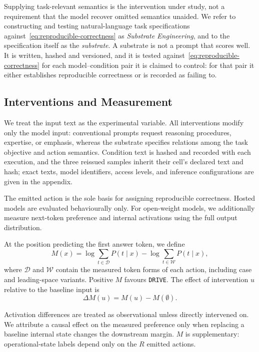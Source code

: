 Supplying task-relevant semantics is the intervention under study, not
a requirement that the model recover omitted semantics unaided. We
refer to constructing and testing natural-language task specifications
against~\eqref{eq:reproducible-correctness} as \emph{Substrate
Engineering}, and to the specification itself as the \emph{substrate}.
A substrate is not a prompt that scores well. It is written, hashed and
versioned, and it is tested against~\eqref{eq:reproducible-correctness}
for each model--condition pair it is claimed to control: for that pair it
either establishes reproducible correctness or is recorded as failing to.


\subsection{Interventions and Measurement}
\label{sec:interventions-measurement}

We treat the input text as the experimental variable. All
interventions modify only the model input: conventional prompts request
reasoning procedures, expertise, or emphasis, whereas the substrate
specifies relations among the task objective and action semantics.
Condition text is hashed and recorded with each execution, and the
three reissued samples inherit their cell's declared text and hash;
exact texts, model identifiers, access levels, and inference
configurations are given in the appendix.

The emitted action is the sole basis for assigning reproducible
correctness. Hosted models are evaluated behaviourally only. For
open-weight models, we additionally measure next-token preference and
internal activations using the full output distribution.

At the position predicting the first answer token, we define
\begin{equation}
    M(x) = \log \sum_{t \in \mathcal{D}} P(t \mid x)
         - \log \sum_{t \in \mathcal{W}} P(t \mid x),
    \label{eq:decision-margin}
\end{equation}
where $\mathcal{D}$ and $\mathcal{W}$ contain the measured token forms
of each action, including case and leading-space variants. Positive
$M$ favours \texttt{DRIVE}. The effect of intervention $u$ relative
to the baseline input is
\begin{equation}
    \Delta M(u) = M(u) - M(\emptyset).
    \label{eq:intervention-effect}
\end{equation}

Activation differences are treated as observational unless directly
intervened on. We attribute a causal effect on the measured preference
only when replacing a baseline internal state changes the downstream
margin. $M$ is supplementary: operational-state labels depend only on
the $R$ emitted actions.


